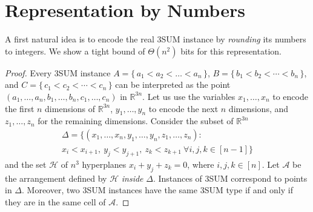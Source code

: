 \section{Representation by Numbers}%
\label{s:numbers}

A first natural idea is to encode the real 3SUM instance by \emph{rounding} its numbers to integers.
We show a tight bound of $\Theta (n^2)$ bits for this representation.
\restate{\TheoremSUMEncodingBitsize*}

\begin{proof}
Every 3SUM instance \(A = \{\, a_1 < a_2 < \ldots < a_n\,\} \),
\(B = \{\, b_1 < b_2 < \cdots < b_n\,\} \),
and \(C = \{\, c_1 < c_2 < \cdots < c_n\,\}\)
can be interpreted as the point
\( (a_1,\ldots,a_n,b_1,\ldots,b_n,c_1,\ldots,c_n) \)
in \(\mathbb{R}^{3n}\).
Let us use the variables \(x_1,\ldots,x_n\) to encode the first \(n\) dimensions
of \(\mathbb{R}^{3n}\), \(y_1,\ldots,y_n\) to encode the next \(n\) dimensions,
and \(z_1,\ldots,z_n\) for the remaining dimensions.
Consider the subset of $\mathbb{R}^{3n}$
\begin{multline*}
      \Delta = \{ (x_1,\ldots,x_n,y_1,\ldots,y_n,z_1,\ldots,z_n) \colon\, \\
			      x_i<x_{i+1}, ~y_j<y_{j+1}, ~ z_k<z_{k+1}~ \forall i,j,k \in [n-1]\}
\end{multline*}
and the set \(\mathcal{H}\) of $n^3$ hyperplanes $x_i+y_j+z_k=0$, where $i,j,k\in [n]$.
Let $\mathcal{A}$ be the arrangement defined
by \(\mathcal{H}\) \emph{inside} $\Delta$.
%
Instances of 3SUM correspond to points in $\Delta$.
%
Moreover, two 3SUM instances have the same 3SUM type if and only if they are
in the same cell of $\mathcal{A}$.


\end{proof}
